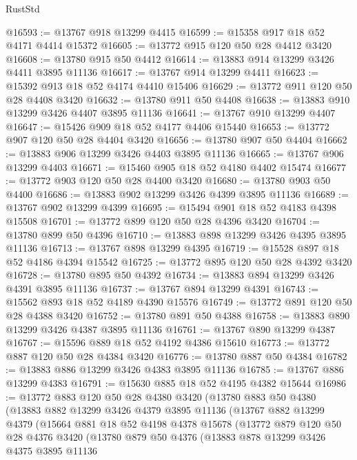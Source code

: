 \begin{lexlean}{RustStd}
\begin{coremodule}
@16593 := @13767 @918 @13299 @4415
@16599 := @15358 @917 @18 @52 @4171 @4414 @15372
@16605 := @13772 @915 @120 @50 @28 @4412 @3420
@16608 := @13780 @915 @50 @4412
@16614 := @13883 @914 @13299 @3426 @4411 @3895 @11136
@16617 := @13767 @914 @13299 @4411
@16623 := @15392 @913 @18 @52 @4174 @4410 @15406
@16629 := @13772 @911 @120 @50 @28 @4408 @3420
@16632 := @13780 @911 @50 @4408
@16638 := @13883 @910 @13299 @3426 @4407 @3895 @11136
@16641 := @13767 @910 @13299 @4407
@16647 := @15426 @909 @18 @52 @4177 @4406 @15440
@16653 := @13772 @907 @120 @50 @28 @4404 @3420
@16656 := @13780 @907 @50 @4404
@16662 := @13883 @906 @13299 @3426 @4403 @3895 @11136
@16665 := @13767 @906 @13299 @4403
@16671 := @15460 @905 @18 @52 @4180 @4402 @15474
@16677 := @13772 @903 @120 @50 @28 @4400 @3420
@16680 := @13780 @903 @50 @4400
@16686 := @13883 @902 @13299 @3426 @4399 @3895 @11136
@16689 := @13767 @902 @13299 @4399
@16695 := @15494 @901 @18 @52 @4183 @4398 @15508
@16701 := @13772 @899 @120 @50 @28 @4396 @3420
@16704 := @13780 @899 @50 @4396
@16710 := @13883 @898 @13299 @3426 @4395 @3895 @11136
@16713 := @13767 @898 @13299 @4395
@16719 := @15528 @897 @18 @52 @4186 @4394 @15542
@16725 := @13772 @895 @120 @50 @28 @4392 @3420
@16728 := @13780 @895 @50 @4392
@16734 := @13883 @894 @13299 @3426 @4391 @3895 @11136
@16737 := @13767 @894 @13299 @4391
@16743 := @15562 @893 @18 @52 @4189 @4390 @15576
@16749 := @13772 @891 @120 @50 @28 @4388 @3420
@16752 := @13780 @891 @50 @4388
@16758 := @13883 @890 @13299 @3426 @4387 @3895 @11136
@16761 := @13767 @890 @13299 @4387
@16767 := @15596 @889 @18 @52 @4192 @4386 @15610
@16773 := @13772 @887 @120 @50 @28 @4384 @3420
@16776 := @13780 @887 @50 @4384
@16782 := @13883 @886 @13299 @3426 @4383 @3895 @11136
@16785 := @13767 @886 @13299 @4383
@16791 := @15630 @885 @18 @52 @4195 @4382 @15644
@16986 := @13772
    @883
    @120
    @50
    @28
    @4380
    @3420
    (@13780
      @883
      @50
      @4380
      (@13883
        @882
        @13299
        @3426
        @4379
        @3895
        @11136
        (@13767
          @882
          @13299
          @4379
          (@15664
            @881
            @18
            @52
            @4198
            @4378
            @15678
            (@13772
              @879
              @120
              @50
              @28
              @4376
              @3420
              (@13780
                @879
                @50
                @4376
                (@13883
                  @878
                  @13299
                  @3426
                  @4375
                  @3895
                  @11136

\end{coremodule}
\end{lexlean}
